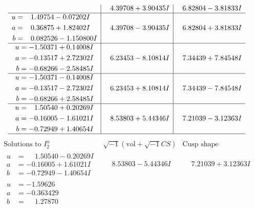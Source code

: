 \documentclass[1p]{elsarticle_modified}
\theoremstyle{definition}
\newcommand{\I}{\sqrt{-1}}
\begin{document}
$$\begin{array}{c|c|c}
 & \phantom{-}4.39708 + 3.90435 I & \phantom{-}6.82804 - 3.81833 I \\ \hline\begin{aligned}
u &= \phantom{-}1.49754 - 0.07202 I \\
a &= \phantom{-}0.36875 + 1.82402 I \\
b &= \phantom{-}0.082526 - 1.150800 I\end{aligned}
 & \phantom{-}4.39708 - 3.90435 I & \phantom{-}6.82804 + 3.81833 I \\ \hline\begin{aligned}
u &= -1.50371 + 0.14008 I \\
a &= -0.13517 + 2.72302 I \\
b &= -0.68266 - 2.58485 I\end{aligned}
 & \phantom{-}6.23453 - 8.10814 I & \phantom{-}7.34439 + 7.84548 I \\ \hline\begin{aligned}
u &= -1.50371 - 0.14008 I \\
a &= -0.13517 - 2.72302 I \\
b &= -0.68266 + 2.58485 I\end{aligned}
 & \phantom{-}6.23453 + 8.10814 I & \phantom{-}7.34439 - 7.84548 I \\ \hline\begin{aligned}
u &= \phantom{-}1.50540 + 0.20269 I \\
a &= -0.16005 - 1.61021 I \\
b &= -0.72949 + 1.40654 I\end{aligned}
 & \phantom{-}8.53803 + 5.44346 I & \phantom{-}7.21039 - 3.12363 I\\
 \hline 
 \end{array}$$\newpage$$\begin{array}{c|c|c}  
\text{Solutions to }I^u_{2}& \I (\text{vol} + \sqrt{-1}CS) & \text{Cusp shape}\\
 \hline 
\begin{aligned}
u &= \phantom{-}1.50540 - 0.20269 I \\
a &= -0.16005 + 1.61021 I \\
b &= -0.72949 - 1.40654 I\end{aligned}
 & \phantom{-}8.53803 - 5.44346 I & \phantom{-}7.21039 + 3.12363 I \\ \hline\begin{aligned}
u &= -1.59626\phantom{ +0.000000I} \\
a &= -0.363429\phantom{ +0.000000I} \\
b &= \phantom{-}1.27870\phantom{ +0.000000I}\end{aligned}

\end{array}$$
\end{document}
